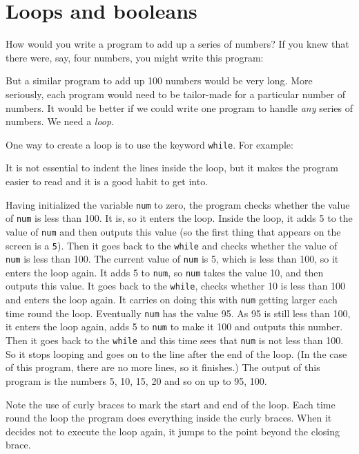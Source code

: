 \section{Loops and booleans}

How would you write a program to add up a series of numbers?
If you knew that there were, say, four numbers, you might write
this program:


But a similar program to add up 100 numbers would be very long.
More seriously, each program would need to be tailor-made for a particular
number of numbers.  It would be better if we could write one program
to handle \emph{any} series of numbers.  We need a \emph{loop}.

One way to create a loop is to use the keyword \texttt{while}.
For example:


It is not essential to indent the lines inside the loop, but it makes the
program easier to read and it is a good habit to get into.


Having initialized the variable \texttt{num} to zero, the program checks
whether the value of \texttt{num} is less than 100.  It is, so it
enters the loop.  Inside the loop, it adds 5 to the value of
\texttt{num} and then outputs this value (so the first thing that
appears on the screen is a \texttt{5}).  Then it goes back to the
  \texttt{while} and checks whether the value of \texttt{num} is less than
100.  The current value of \texttt{num} is 5, which is less than 100,
so it enters the loop again.  It adds 5 to \texttt{num}, so
\texttt{num} takes the value 10, and then outputs this value.  It goes back
to the \texttt{while}, checks whether 10 is less than 100 and enters
the loop again.  It carries on doing this with \texttt{num} getting
larger each time round the loop.  Eventually \texttt{num} has the
value 95. As 95 is still less than 100, it enters the loop again, adds 5 to
\texttt{num} to make it 100 and outputs this number.  Then it goes
back to the \texttt{while} and this time sees that \texttt{num} is not
less than 100.  So it stops looping and goes on to the line after the
end of the loop.  (In the case of this program, there are no more
lines, so it finishes.)  The output of this program is the numbers 5,
10, 15, 20 and so on up to 95, 100.

Note the use of curly braces to mark the start and end of the loop.
Each time round the loop the program does everything inside the curly braces.
When it decides not to execute the loop again, it jumps to the point
beyond the closing brace.

